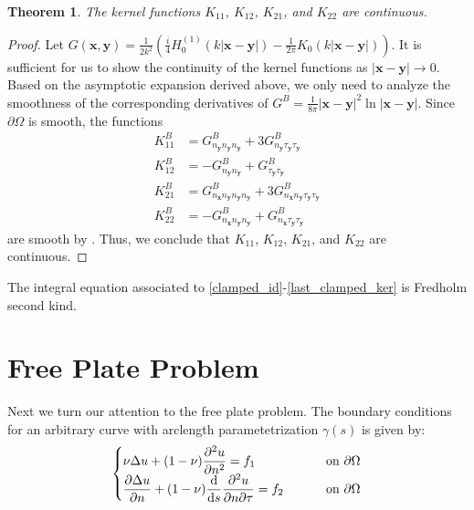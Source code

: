 \documentclass[preprint,12pt,3p]{elsarticle}
\newtheorem{thm}{Theorem}
\begin{document}
\begin{thm}
The kernel functions $K_{11}$, $K_{12}$, $K_{21}$, and $K_{22}$ are continuous. \label{clampedsmooth}
\end{thm}

\begin{proof}
    Let $G(\mathbf{x},\mathbf{y}) =  \frac{1}{2k^2} (\frac{i}{4} H_0^{(1)} (k |\mathbf{x} - \mathbf{y}|) - \frac{1}{2\pi} K_0 (k | \mathbf{x} - \mathbf{y}|)) $. It is sufficient for us to show the continuity of the kernel functions as $|\mathbf{x}-\mathbf{y}| \to 0$. Based on the asymptotic expansion derived above, we only need to analyze the smoothness of the corresponding derivatives of  $G^{B} = \frac{1}{8\pi}|\mathbf{x}-\mathbf{y}|^2\ln|\mathbf{x}-\mathbf{y}|$. Since $\partial \Omega$ is smooth, the functions \begin{align}
    K^{B}_{11} &= G^{B}_{n_\mathbf{y} n_\mathbf{y} n_\mathbf{y}} + 3G^{B}_{n_\mathbf{y} \tau_\mathbf{y} \tau_\mathbf{y}} \\
    K^{B}_{12} &= - G^{B}_{n_\mathbf{y} n_\mathbf{y}} + G^{B}_{\tau_\mathbf{y} \tau_\mathbf{y}} \\
    K^{B}_{21} &= G^{B}_{n_\mathbf{x} n_\mathbf{y} n_\mathbf{y} n_\mathbf{y}} + 3G^{B}_{n_\mathbf{x} n_\mathbf{y} \tau_\mathbf{y} \tau_\mathbf{y}} \\
    K^{B}_{22} &= - G^{B}_{n_\mathbf{x} n_\mathbf{y} n_\mathbf{y}} + G^{B}_{n_\mathbf{x} \tau_\mathbf{y} \tau_\mathbf{y}} 
\end{align} are smooth by \cite{farkas}. Thus, we conclude that $K_{11}$, $K_{12}$, $K_{21}$, and $K_{22}$ are continuous.
\end{proof}

\begin{cor}
    The integral equation associated to \eqref{clamped_id}-\eqref{last_clamped_ker} is Fredholm second kind.
\end{cor}


\section{Free Plate Problem} \label{freesection}

Next we turn our attention to the free plate problem. The boundary conditions for an arbitrary curve with arclength parametetrization $\gamma(s)$ is given by: 
\begin{align}
\begin{cases}
    \displaystyle \nu \Delta u + (1-\nu) \frac{\partial^2 u}{\partial n^2}= f_1  &\qquad \text{ on } \partial \Omega \\
     \displaystyle \frac{\partial \Delta u}{\partial n}  + (1 -\nu) \frac{\rm d}{{\rm d} s} \frac{\partial^2 u }{\partial n \partial \tau}  = f_2  & \qquad \text{ on } \partial \Omega 
\end{cases} \label{freebcs}
\end{align}
\end{document}
